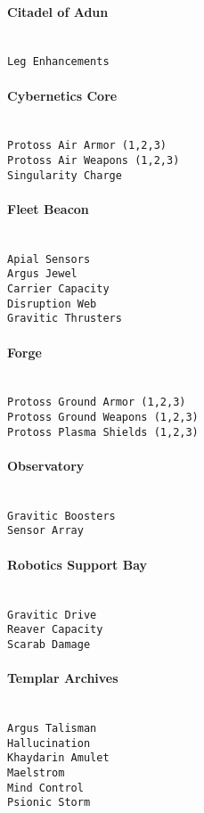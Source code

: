 \paragraph{Citadel of Adun} \mbox{}\\
\verb|Leg Enhancements|

\paragraph{Cybernetics Core} \mbox{}\\
\verb|Protoss Air Armor (1,2,3)|\\
\verb|Protoss Air Weapons (1,2,3)|\\
\verb|Singularity Charge|

\paragraph{Fleet Beacon} \mbox{}\\
\verb|Apial Sensors|\\
\verb|Argus Jewel|\\
\verb|Carrier Capacity|\\
\verb|Disruption Web|\\
\verb|Gravitic Thrusters|

\paragraph{Forge} \mbox{}\\
\verb|Protoss Ground Armor (1,2,3)|\\
\verb|Protoss Ground Weapons (1,2,3)|\\
\verb|Protoss Plasma Shields (1,2,3)|

\paragraph{Observatory} \mbox{}\\
\verb|Gravitic Boosters|\\
\verb|Sensor Array|

\paragraph{Robotics Support Bay} \mbox{}\\
\verb|Gravitic Drive|\\
\verb|Reaver Capacity|\\
\verb|Scarab Damage|

\paragraph{Templar Archives} \mbox{}\\
\verb|Argus Talisman|\\
\verb|Hallucination|\\
\verb|Khaydarin Amulet|\\
\verb|Maelstrom|\\
\verb|Mind Control|\\
\verb|Psionic Storm|

